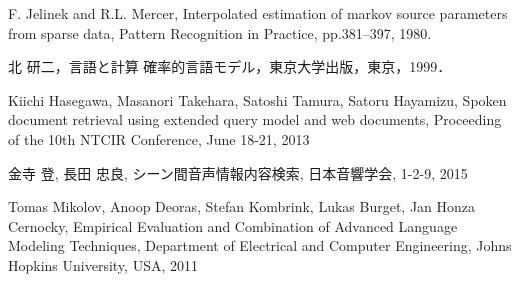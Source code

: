 \documentclass[a4paper,twocolumn,report,10.5pt]{jsbook}
\begin{document}
\begin{thebibliography}{99}
F. Jelinek and R.L. Mercer, Interpolated estimation of markov source parameters
from sparse data, Pattern Recognition in Practice, pp.381–397, 1980.



北 研二，言語と計算 確率的言語モデル，東京大学出版，東京，1999．

Kiichi Hasegawa, Masanori Takehara, Satoshi Tamura, Satoru Hayamizu, Spoken document retrieval using extended query model and web documents, Proceeding of the 10th NTCIR Conference, June 18-21, 2013

金寺 登, 長田 忠良, シーン間音声情報内容検索, 日本音響学会, 1-2-9, 2015

Tomas Mikolov, Anoop Deoras, Stefan Kombrink, Lukas Burget, Jan Honza Cernocky, Empirical Evaluation and Combination of Advanced Language Modeling Techniques, Department of Electrical and Computer Engineering, Johns Hopkins University, USA, 2011










\end{thebibliography}
\end{document}
